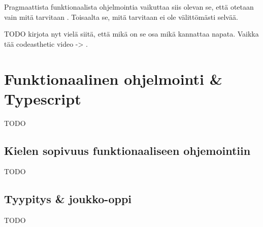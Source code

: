 Pragmaattista funktionaalista ohjelmointia vaikuttaa siis olevan se, että otetaan vain mitä tarvitaan \cite{dear_functional_bros,martin2017pragmaticfp,cantarella_fp_haitat}. Toisaalta se, mitä tarvitaan ei ole välittömästi selvää.

TODO kirjota nyt vielä siitä, että mikä on se osa mikä kannattaa napata. Vaikka tää codeasthetic video -> \cite{dear_functional_bros}.

\section{Funktionaalinen ohjelmointi \& Typescript}

TODO



\subsection{Kielen sopivuus funktionaaliseen ohjemointiin}

TODO


\subsection{Tyypitys \& joukko-oppi}

TODO





